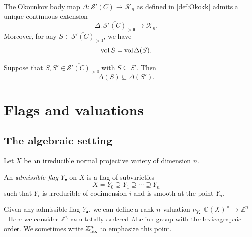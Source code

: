 \begin{theorem}\label{thm:Okocont}
	The Okounkov body map $\Delta\colon \mathcal{S}'(C) \rightarrow \mathcal{K}_n$
    as defined in \cref{def:Okokk} admits a unique continuous extension
	\begin{equation}\label{eq:Deltagensg}
		\Delta \colon \overline{\mathcal{S}'(C)}_{>0}\rightarrow \mathcal{K}_n.
	\end{equation}
     Moreover, for any $S\in \overline{\mathcal{S}'(C)}_{>0}$, we have
	\begin{equation}\label{eq:volWfinal}
		\operatorname{vol} S=\operatorname{vol} \Delta(S).
	\end{equation}
\end{theorem}




\begin{corollary}\label{cor:Okocomp}
    Suppose that $S,S'\in \overline{\mathcal{S}'(C)}_{>0}$ with $S\subseteq S'$. Then
    \begin{equation}\label{eq:Deltacontain}
    \Delta(S)\subseteq \Delta(S').
    \end{equation}
\end{corollary}

\section{Flags and valuations}\label{sec:flag}

\subsection{The algebraic setting}\label{subsec:flagvalalgebraic}
Let $X$ be an irreducible normal projective variety of dimension $n$.
\begin{definition}\label{def:admfl}
	An \emph{admissible flag} $Y_{\bullet}$ on $X$ is a flag of subvarieties
	\[
		X=Y_0\supseteq Y_1\supseteq \cdots\supseteq Y_n
	\]
	such that $Y_i$ is irreducible of codimension $i$ and is smooth at the point $Y_n$.
\end{definition}


Given any admissible flag $Y_{\bullet}$, we can define a rank $n$ valuation $\nu_{Y_{\bullet}}\colon \mathbb{C}(X)^{\times}\rightarrow \mathbb{Z}^n$. Here we consider $\mathbb{Z}^n$ as a totally ordered Abelian group with the lexicographic order.
We sometimes write $\mathbb{Z}^n_{\mathrm{lex}}$ to emphasize this point.

